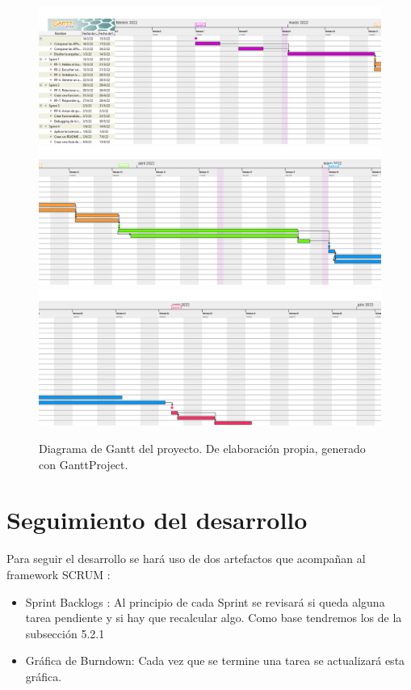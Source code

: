\begin{figure}[h]
	\centering
	\includegraphics[width=\textwidth]{imagenes/Gantt1.png} \\
	\includegraphics[width=\textwidth]{imagenes/Gantt2.png} \\
	\includegraphics[width=\textwidth]{imagenes/Gantt3.png} \\
	\caption[Diagrama de Gantt]{Diagrama de Gantt del proyecto. De elaboración propia, generado con GanttProject.}
	\label{fig:gantt}
\end{figure}


\section{Seguimiento del desarrollo}
Para seguir el desarrollo se hará uso de dos artefactos que acompañan al framework SCRUM \cite{scrum}:
\begin{itemize}
	\item Sprint Backlogs : Al principio de cada Sprint se revisará si queda alguna tarea pendiente y si hay que recalcular algo. Como base tendremos los de la subsección 5.2.1
	\item Gráfica de Burndown: Cada vez que se termine una tarea se actualizará esta gráfica.
\end{itemize}

